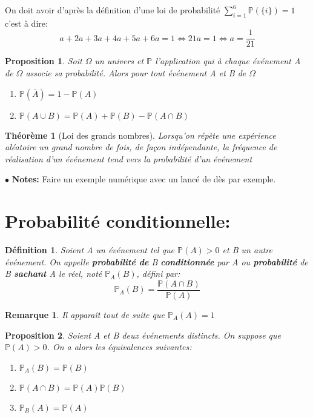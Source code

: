 \documentclass[a4paper]{report}
\theoremstyle{break}
\newtheorem{mydef}{Définition}[chapter]
\newtheorem{theo}{Théorème}[chapter]
\newtheorem*{Rem}{Remarque}
\newtheorem{prop}{Proposition}[chapter]
\newcommand{\p}{\mathbb{P}}
\newcounter{exem}
\newcommand{\note}{$\bullet$ \textbf{Notes: }}
\begin{document}
On doit avoir d'après la définition d'une loi de probabilité $\sum \limits_{i=1}^6 \mathbb{P}(\{ i \}) = 1$ c'est à
dire:
\[
  a + 2a + 3a +4a +5a +6a = 1 \Leftrightarrow 21a = 1 \Leftrightarrow
  a = \frac{1}{21}
\]

\begin{prop}
  Soit  $\Omega$ un univers et $\mathbb{P}$ l'application qui à chaque événement
  A de $\Omega$ associe sa probabilité. Alors pour tout événement A et
  B de $\Omega$
  \begin{enumerate}
  \item $\mathbb{P}(\overline{A}) = 1 - \mathbb{P}(A)$
  \item $\mathbb{P}(A \cup B) = \mathbb{P}(A) + \mathbb{P}(B) -
    \mathbb{P}(A \cap B)$
  \end{enumerate}
\end{prop}

\begin{theo}[Loi des grands nombres]
  Lorsqu'on répète une expérience aléatoire un grand nombre de fois,
  de façon indépendante, la fréquence de réalisation d'un événement
  tend vers la probabilité d'un événement
\end{theo}

\note Faire un exemple numérique avec un lancé de dès par exemple. 

\section{Probabilité conditionnelle: }
\begin{mydef}
  Soient A un événement tel que $\mathbb{P}(A) > 0$ et B un autre
  événement. On appelle \textbf{probabilité de} B \textbf{conditionnée} par A ou
  \textbf{probabilité} de B \textbf{sachant} A le réel, noté
  $\mathbb{P}_A(B)$, défini par:
  \[
    \mathbb{P}_A(B) = \frac{\mathbb{P}(A \cap B)}{\mathbb{P}(A)}
  \]
\end{mydef}

\begin{Rem}
  Il apparaît tout de suite que $\mathbb{P}_A(A) = 1$
\end{Rem}

\begin{prop}
  Soient A et B deux événements distincts. On suppose que
  $\mathbb{P}(A) > 0$. On a alors les équivalences suivantes:
  \begin{enumerate}[label = (\arabic*)]
  \item $\p_A(B) = \p(B)$
  \item $\p(A \cap B) = \p(A) \p(B)$
  \item $\p_B(A) = \p(A)$
  \end{enumerate}
\end{prop}
\end{document}
